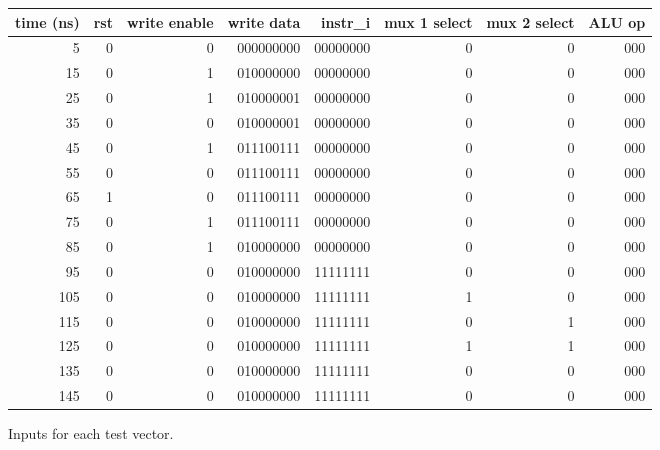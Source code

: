 \documentclass{article}
\begin{document}
\begin{figure}[h]
	\begin{tabular}{r r r r r r r r}
		time (ns) & rst & write enable & write data & instr\_i  & mux 1 select & mux 2 select & ALU op\\
		\hline
		  5 & 0   & 0            & 000000000  & 00000000 & 0            & 0            & 000\\ 
		 15 & 0   & 1            & 010000000  & 00000000 & 0            & 0            & 000\\ 
		 25 & 0   & 1            & 010000001  & 00000000 & 0            & 0            & 000\\ 
		 35 & 0   & 0            & 010000001  & 00000000 & 0            & 0            & 000\\ 
		 45 & 0   & 1            & 011100111  & 00000000 & 0            & 0            & 000\\ 
		 55 & 0   & 0            & 011100111  & 00000000 & 0            & 0            & 000\\ 
		 65 & 1   & 0            & 011100111  & 00000000 & 0            & 0            & 000\\ 
		 75 & 0   & 1            & 011100111  & 00000000 & 0            & 0            & 000\\ 
		 85 & 0   & 1            & 010000000  & 00000000 & 0            & 0            & 000\\ 
		 95 & 0   & 0            & 010000000  & 11111111 & 0            & 0            & 000\\ 
		105 & 0   & 0            & 010000000  & 11111111 & 1            & 0            & 000\\ 
		115 & 0   & 0            & 010000000  & 11111111 & 0            & 1            & 000\\ 
		125 & 0   & 0            & 010000000  & 11111111 & 1            & 1            & 000\\ 
		135 & 0   & 0            & 010000000  & 11111111 & 0            & 0            & 000\\ 
		145 & 0   & 0            & 010000000  & 11111111 & 0            & 0            & 000\\ 
		\end{tabular}
		\caption{Inputs for each test vector.}
\end{figure}


\FloatBarrier
\end{document}
